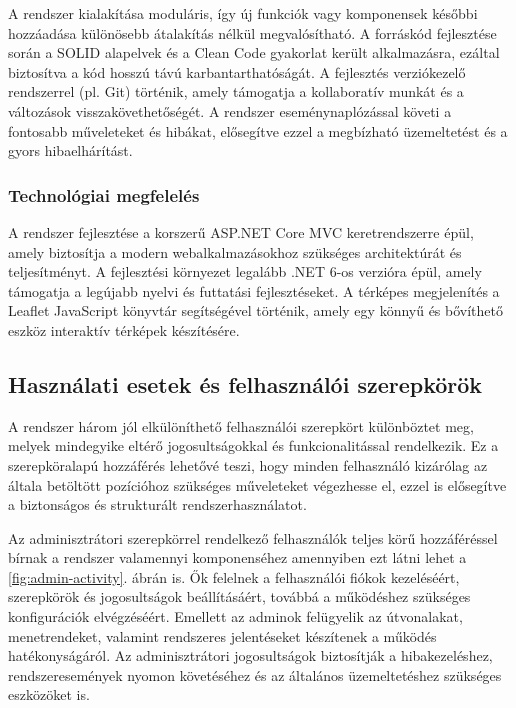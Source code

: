 A rendszer kialakítása moduláris, így új funkciók vagy komponensek későbbi hozzáadása különösebb átalakítás nélkül megvalósítható. A forráskód fejlesztése során a SOLID alapelvek és a Clean Code gyakorlat került alkalmazásra, ezáltal biztosítva a kód hosszú távú karbantarthatóságát. A fejlesztés verziókezelő rendszerrel (pl. Git) történik, amely támogatja a kollaboratív munkát és a változások visszakövethetőségét. A rendszer eseménynaplózással követi a fontosabb műveleteket és hibákat, elősegítve ezzel a megbízható üzemeltetést és a gyors hibaelhárítást.

\subsubsection{Technológiai megfelelés}

A rendszer fejlesztése a korszerű ASP.NET Core MVC keretrendszerre épül, amely biztosítja a modern webalkalmazásokhoz szükséges architektúrát és teljesítményt. A fejlesztési környezet legalább .NET 6-os verzióra épül, amely támogatja a legújabb nyelvi és futtatási fejlesztéseket. A térképes megjelenítés a Leaflet JavaScript könyvtár segítségével történik, amely egy könnyű és bővíthető eszköz interaktív térképek készítésére.

\newpage
\subsection{Használati esetek és felhasználói szerepkörök}

A rendszer három jól elkülöníthető felhasználói szerepkört különböztet meg, melyek mindegyike eltérő jogosultságokkal és funkcionalitással rendelkezik. Ez a szerepköralapú hozzáférés lehetővé teszi, hogy minden felhasználó kizárólag az általa betöltött pozícióhoz szükséges műveleteket végezhesse el, ezzel is elősegítve a biztonságos és strukturált rendszerhasználatot.

Az adminisztrátori szerepkörrel rendelkező felhasználók teljes körű hozzáféréssel bírnak a rendszer valamennyi komponenséhez amennyiben ezt látni lehet a \ref{fig:admin-activity}. ábrán is. Ők felelnek a felhasználói fiókok kezeléséért, szerepkörök és jogosultságok beállításáért, továbbá a működéshez szükséges konfigurációk elvégzéséért. Emellett az adminok felügyelik az útvonalakat, menetrendeket, valamint rendszeres jelentéseket készítenek a működés hatékonyságáról. Az adminisztrátori jogosultságok biztosítják a hibakezeléshez, rendszeresemények nyomon követéséhez és az általános üzemeltetéshez szükséges eszközöket is.

